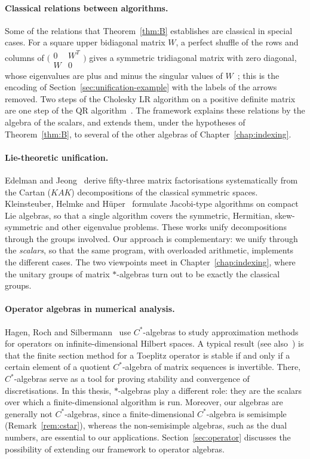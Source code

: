 \documentclass[12pt, a4paper]{report}
\theoremstyle{plain}
\theoremstyle{definition}
\theoremstyle{remark}
\theoremstyle{plain}
\begin{document}
\paragraph{Classical relations between algorithms.}
Some of the relations that Theorem~\ref{thm:B} establishes are classical in special cases. For a square upper bidiagonal matrix $W$, a perfect shuffle of the rows and columns of $\bigl(\begin{smallmatrix}0&W^T\\W&0\end{smallmatrix}\bigr)$ gives a symmetric tridiagonal matrix with zero diagonal, whose eigenvalues are plus and minus the singular values of $W$~\cite{GolubKahan1965,DemmelKahan1990}; this is the encoding of Section~\ref{sec:unification-example} with the labels of the arrows removed. Two steps of the Cholesky LR algorithm on a positive definite matrix are one step of the QR algorithm~\cite{Xu1998}. The framework explains these relations by the algebra of the scalars, and extends them, under the hypotheses of Theorem~\ref{thm:B}, to several of the other algebras of Chapter~\ref{chap:indexing}.

\paragraph{Lie-theoretic unification.}
Edelman and Jeong~\cite{EdelmanJeong2023} derive fifty-three matrix factorisations systematically from the Cartan ($KAK$) decompositions of the classical symmetric spaces. Kleinsteuber, Helmke and H\"uper~\cite{KleinsteuberHelmkeHuper2004} formulate Jacobi-type algorithms on compact Lie algebras, so that a single algorithm covers the symmetric, Hermitian, skew-symmetric and other eigenvalue problems. These works unify decompositions through the groups involved. Our approach is complementary: we unify through the \emph{scalars}, so that the same program, with overloaded arithmetic, implements the different cases. The two viewpoints meet in Chapter~\ref{chap:indexing}, where the unitary groups of matrix $*$-algebras turn out to be exactly the classical groups.

\paragraph{Operator algebras in numerical analysis.}
Hagen, Roch and Silbermann~\cite{HagenRochSilbermann2001} use $C^*$-algebras to study approximation methods for operators on infinite-dimensional Hilbert spaces. A typical result (see also~\cite{BoettcherSilbermann1999}) is that the finite section method for a Toeplitz operator is stable if and only if a certain element of a quotient $C^*$-algebra of matrix sequences is invertible. There, $C^*$-algebras serve as a tool for proving stability and convergence of discretisations. In this thesis, $*$-algebras play a different role: they are the scalars over which a finite-dimensional algorithm is run. Moreover, our algebras are generally not $C^*$-algebras, since a finite-dimensional $C^*$-algebra is semisimple (Remark~\ref{rem:cstar}), whereas the non-semisimple algebras, such as the dual numbers, are essential to our applications. Section~\ref{sec:operator} discusses the possibility of extending our framework to operator algebras.
\end{document}

